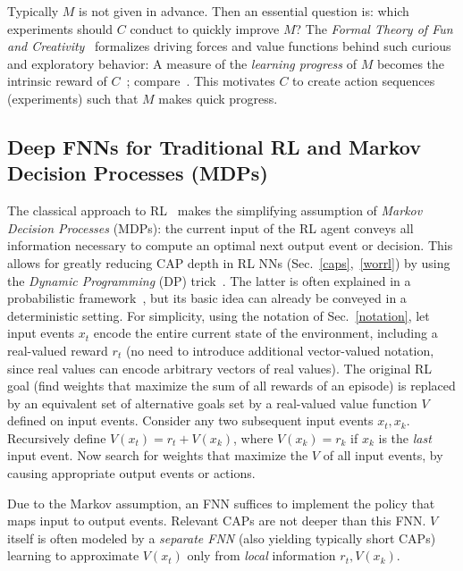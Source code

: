 \documentclass[letterpaper]{article}
\begin{document}
\begin{sloppypar}
Typically $M$ is not given in advance. Then 
an essential question is: which experiments should $C$ conduct to quickly improve $M$?
The {\em Formal Theory of Fun and Creativity}~\citep[e.g.,][]{Schmidhuber:06cs,Schmidhuber:13powerplay}
 formalizes driving forces and value functions behind such curious and exploratory behavior: 
A measure of the {\em learning progress} of $M$ becomes the intrinsic reward of $C$~\citep{Schmidhuber:91singaporecur}; compare~\citep{Singh:05nips,Oudeyer:12intrinsic}.
This motivates $C$ to create action sequences (experiments) such that $M$ makes quick progress.



\subsection{Deep FNNs for Traditional RL and Markov Decision Processes (MDPs)}
\label{trarl}

The classical
approach to RL~\citep{Samuel:59,Bertsekas:96} makes the simplifying 
assumption of {\em Markov Decision Processes} (MDPs): 
the current input of the RL agent
conveys all information necessary to compute an optimal next 
output event or decision. 
This allows for greatly reducing CAP depth in RL NNs (Sec.~\ref{caps},~\ref{worrl}) 
by using the {\em Dynamic Programming} (DP) trick~\citep{Bellman:1957}.
The latter is often explained in a probabilistic framework~\citep[e.g.,][]{Sutton:98}, 
but its basic idea can already be conveyed in a deterministic setting.
For simplicity, 
using the notation of Sec.~\ref{notation},
let input events $x_t$ encode the entire current state of
the environment, including a real-valued reward $r_t$
(no need to introduce additional vector-valued notation, 
since real values can encode arbitrary vectors of real values).
The original RL goal (find weights that maximize the sum of all rewards of an episode) 
is replaced by an equivalent set of alternative goals set by a
real-valued value function $V$ defined on input events.
Consider any two subsequent input events $x_t,x_k$.
Recursively define $V(x_t)=r_t+V(x_k)$, where $V(x_k)=r_k$ if $x_k$ is the {\em last} input event.
Now search for weights that maximize the $V$ 
of all input events, 
by causing appropriate output events or actions. 

Due to the Markov assumption,
an FNN suffices to implement the policy that maps input to output events.
Relevant CAPs are not deeper than this FNN. 
$V$ itself is often modeled by a {\em separate FNN} (also yielding typically short CAPs) 
learning to approximate $V(x_t)$ 
only from {\em local} information $r_t, V(x_k)$.


\end{sloppypar}
\end{document}
